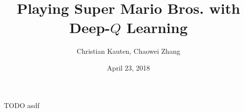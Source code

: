 \documentclass{beamer}
\title{Playing Super Mario Bros. with Deep-$Q$ Learning}
\author{Christian Kauten, Chaowei Zhang}
\institute{Auburn University}
\date{April 23, 2018}
\begin{document}
\frame{\titlepage}

\begin{frame}{TODO}
asdf
\end{frame}

%     
%     
\end{document}
